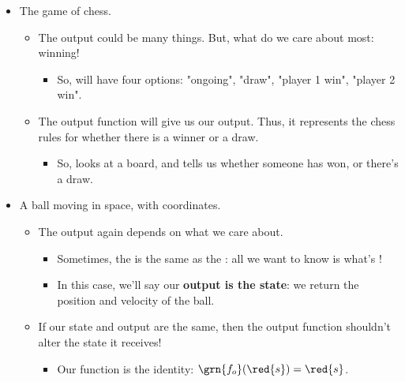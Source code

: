             \begin{itemize}
                \item The game of chess.
                    \begin{itemize}
                        \item The output  could be many things. But, what do we care about most: winning! 
                            \begin{itemize}
                                \item So,  will have four options: "ongoing", "draw", "player 1 win", "player 2 win".
                            \end{itemize}
                            
                        \item The output function  will give us our output. Thus, it represents the chess rules for whether there is a winner or a draw.  
                            \begin{itemize}
                                \item So,  looks at a board, and tells us whether someone has won, or there's a draw.
                            \end{itemize}
                    \end{itemize}
                    
                \item A ball moving in space, with coordinates.
                    \begin{itemize}
                        \item The output  again depends on what we care about.     \begin{itemize}
                                \item Sometimes, the  is the same as the : all we want to know is what's !
                                \item In this case, we'll say our \textbf{output is the state}: we return the position and velocity of the ball.
                            \end{itemize}
                            
                        \item If our state and output are the same, then the output function  shouldn't alter the state it receives!
                            \begin{itemize}
                                \item Our function is the identity: $\grn{f_o}(\red{s}) = \red{s}$.
                            \end{itemize}
                    \end{itemize}
                    

\end{itemize}
